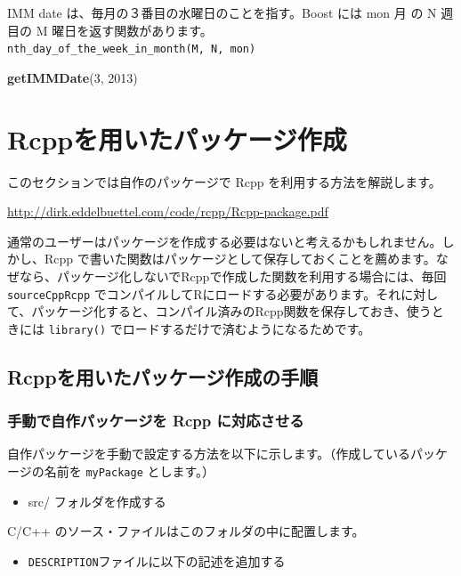 \documentclass[]{book}
\newenvironment{Shaded}{\begin{snugshade}}{\end{snugshade}}
\newcommand{\DecValTok}[1]{\textcolor[rgb]{0.00,0.00,0.81}{#1}}
\newcommand{\KeywordTok}[1]{\textcolor[rgb]{0.13,0.29,0.53}{\textbf{#1}}}
\newcommand{\NormalTok}[1]{#1}
\providecommand{\tightlist}{%
  \setlength{\itemsep}{0pt}\setlength{\parskip}{0pt}}
\begin{document}
IMM date は、毎月の３番目の水曜日のことを指す。Boost には mon 月 の N 週目の M 曜日を返す関数があります。\texttt{nth\_day\_of\_the\_week\_in\_month(M,\ N,\ mon)}

\begin{Shaded}
\begin{Highlighting}[]
\KeywordTok{getIMMDate}\NormalTok{(}\DecValTok{3}\NormalTok{, }\DecValTok{2013}\NormalTok{)}
\end{Highlighting}
\end{Shaded}

\hypertarget{rcpp}{%
\chapter{Rcppを用いたパッケージ作成}\label{rcpp}}

このセクションでは自作のパッケージで Rcpp を利用する方法を解説します。

\url{http://dirk.eddelbuettel.com/code/rcpp/Rcpp-package.pdf}

通常のユーザーはパッケージを作成する必要はないと考えるかもしれません。しかし、Rcpp で書いた関数はパッケージとして保存しておくことを薦めます。なぜなら、パッケージ化しないでRcppで作成した関数を利用する場合には、毎回 \texttt{sourceCppRcpp} でコンパイルしてRにロードする必要があります。それに対して、パッケージ化すると、コンパイル済みのRcpp関数を保存しておき、使うときには \texttt{library()} でロードするだけで済むようになるためです。

\hypertarget{rcpp}{%
\section{Rcppを用いたパッケージ作成の手順}\label{rcpp}}

\hypertarget{-rcpp-}{%
\subsection{手動で自作パッケージを Rcpp に対応させる}\label{-rcpp-}}

自作パッケージを手動で設定する方法を以下に示します。（作成しているパッケージの名前を \texttt{myPackage} とします。）

\begin{itemize}
\tightlist
\item
  src/ フォルダを作成する
\end{itemize}

C/C++ のソース・ファイルはこのフォルダの中に配置します。

\begin{itemize}
\tightlist
\item
  \texttt{DESCRIPTION}ファイルに以下の記述を追加する
\end{itemize}
\end{document}
